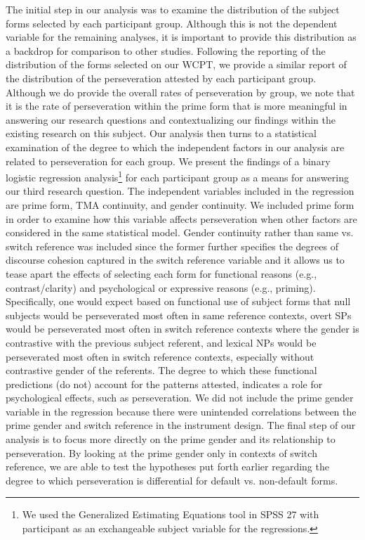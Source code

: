 \documentclass[output=paper]{langscibook}
\begin{document}
The initial step in our analysis was to examine\largerpage{} the distribution of the subject forms selected by each participant group. Although this is not the dependent variable for the remaining analyses, it is important to provide this distribution as a backdrop for comparison to other studies. Following the reporting of the distribution of the forms selected on our WCPT, we provide a similar report of the distribution of the perseveration attested by each participant group. Although we do provide the overall rates of perseveration by group, we note that it is the rate of perseveration within the prime form that is more meaningful in answering our research questions and contextualizing our findings within the existing research on this subject. Our analysis then turns to a statistical examination of the degree to which the independent factors in our analysis are related to perseveration for each group. We present the findings of a binary logistic regression analysis{\footnote{We used the Generalized Estimating Equations tool in SPSS 27 with participant as an exchangeable subject variable for the regressions.}} for each participant group as a means for answering our third research question. The independent variables included in the regression are prime form, TMA continuity, and gender continuity. We included prime form in order to examine how this variable affects perseveration when other factors are considered in the same statistical model. Gender continuity rather than same vs. switch reference was included since the former further specifies the degrees of discourse cohesion captured in the switch reference variable and it allows us to tease apart the effects of selecting each form for functional reasons (e.g., contrast/clarity) and psychological or expressive reasons (e.g., priming). Specifically, one would expect based on functional use of subject forms that null subjects would be perseverated most often in same reference contexts, overt SPs would be perseverated most often in switch reference contexts where the gender is contrastive with the previous subject referent, and lexical NPs would be perseverated most often in switch reference contexts, especially without contrastive gender of the referents. The degree to which these functional predictions (do not) account for the patterns attested, indicates a role for psychological effects, such as perseveration. We did not include the prime gender variable in the regression because there were unintended correlations between the prime gender and switch reference in the instrument design. The final step of our analysis is to focus more directly on the prime gender and its relationship to perseveration. By looking at the prime gender only in contexts of switch reference, we are able to test the hypotheses put forth earlier regarding the degree to which perseveration is differential for default vs. non-default forms.
\end{document}
